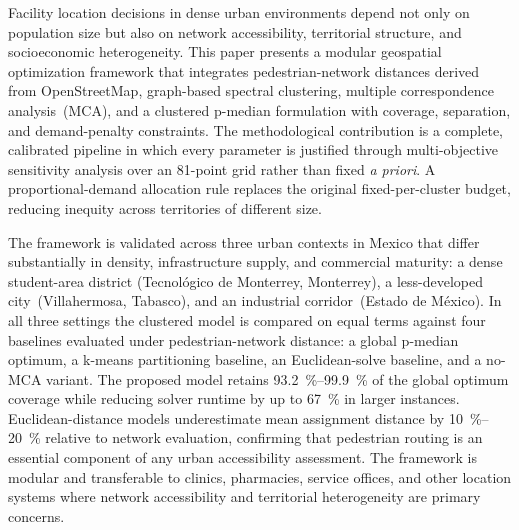 Facility location decisions in dense urban environments depend not only on
population size but also on network accessibility, territorial structure,
and socioeconomic heterogeneity. This paper presents a modular geospatial
optimization framework that integrates pedestrian-network distances derived
from OpenStreetMap, graph-based spectral clustering, multiple correspondence
analysis~(MCA), and a clustered \mbox{p-median} formulation with coverage,
separation, and demand-penalty constraints.
The methodological contribution is a complete, calibrated pipeline in which
every parameter is justified through multi-objective sensitivity
analysis over an 81-point grid rather than fixed \textit{a priori}.
A proportional-demand allocation rule replaces the original fixed-per-cluster
budget, reducing inequity across territories of different size.

The framework is validated across three urban contexts in Mexico that differ
substantially in density, infrastructure supply, and commercial maturity:
a dense student-area district (Tecnológico de Monterrey, Monterrey),
a less-developed city~(Villahermosa, Tabasco), and an industrial
corridor~(Estado de México).
In all three settings the clustered model is compared on equal terms against
four baselines evaluated under pedestrian-network distance:
a global \mbox{p-median} optimum, a \mbox{k-means} partitioning baseline,
an Euclidean-solve baseline, and a no-MCA variant.
The proposed model retains \SIrange{93.2}{99.9}{\percent} of the global
optimum coverage while reducing solver runtime by up to \SI{67}{\percent}
in larger instances.
Euclidean-distance models underestimate mean assignment distance by
\SIrange{10}{20}{\percent} relative to network evaluation, confirming
that pedestrian routing is an essential component of any urban
accessibility assessment.
The framework is modular and transferable to clinics, pharmacies,
service offices, and other location systems where
network accessibility and territorial heterogeneity are primary concerns.
